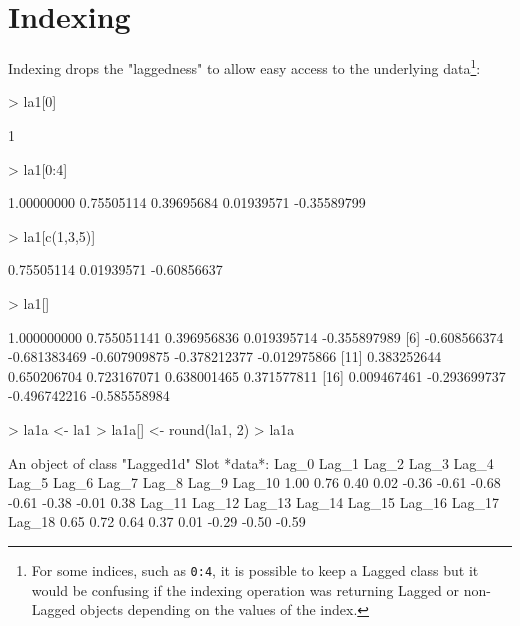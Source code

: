 \documentclass[a4paper,twoside,11pt,nojss,article]{jss}
\begin{document}
\section{Indexing}
\label{sec:org634f5f6}

Indexing drops the "laggedness" to allow easy access to the underlying data\footnote{For some indices, such as \texttt{0:4}, it is possible to keep a Lagged class but it would be
confusing if the indexing operation was returning Lagged or non-Lagged objects depending on
the values of the index.}:
\begin{Schunk}
\begin{Sinput}
> la1[0]
\end{Sinput}
\begin{Soutput}
[1] 1
\end{Soutput}
\begin{Sinput}
> la1[0:4]
\end{Sinput}
\begin{Soutput}
[1]  1.00000000  0.75505114  0.39695684  0.01939571 -0.35589799
\end{Soutput}
\begin{Sinput}
> la1[c(1,3,5)]
\end{Sinput}
\begin{Soutput}
[1]  0.75505114  0.01939571 -0.60856637
\end{Soutput}
\begin{Sinput}
> la1[]
\end{Sinput}
\begin{Soutput}
 [1]  1.000000000  0.755051141  0.396956836  0.019395714 -0.355897989
 [6] -0.608566374 -0.681383469 -0.607909875 -0.378212377 -0.012975866
[11]  0.383252644  0.650206704  0.723167071  0.638001465  0.371577811
[16]  0.009467461 -0.293699737 -0.496742216 -0.585558984
\end{Soutput}
\end{Schunk}


\begin{Schunk}
\begin{Sinput}
> la1a <- la1
> la1a[] <- round(la1, 2)
> la1a
\end{Sinput}
\begin{Soutput}
An object of class "Lagged1d"
Slot *data*: 
 Lag_0  Lag_1  Lag_2  Lag_3  Lag_4  Lag_5  Lag_6  Lag_7  Lag_8  Lag_9 Lag_10 
  1.00   0.76   0.40   0.02  -0.36  -0.61  -0.68  -0.61  -0.38  -0.01   0.38 
Lag_11 Lag_12 Lag_13 Lag_14 Lag_15 Lag_16 Lag_17 Lag_18 
  0.65   0.72   0.64   0.37   0.01  -0.29  -0.50  -0.59 
\end{Soutput}
\end{Schunk}
\end{document}
